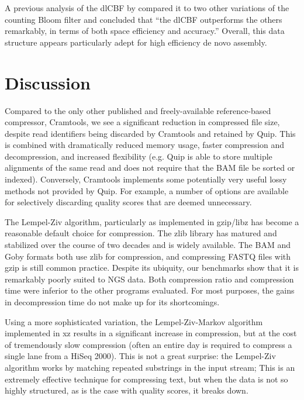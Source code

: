 \documentclass[twocolumn]{article}
\begin{document}
A previous analysis of the dlCBF by \citet{Zhang2009} compared it to two other
variations of the counting Bloom filter and concluded that ``the dlCBF
outperforms the others remarkably, in terms of both space efficiency and
accuracy.'' Overall, this data structure appears particularly adept for high
efficiency de novo assembly.

\section{Discussion}

Compared to the only other published and freely-available reference-based
compressor, Cramtools, we see a significant reduction in compressed file size,
despite read identifiers being discarded by Cramtools and retained by Quip.
This is combined with dramatically reduced memory usage, faster compression
and decompression, and increased flexibility (e.g. Quip is able to store
multiple alignments of the same read and does not require that the BAM file be
sorted or indexed). Conversely, Cramtools implements some potentially very
useful lossy methods not provided by Quip. For example, a number of options
are available for selectively discarding quality scores that are deemed
unnecessary.



The Lempel-Ziv algorithm, particularly as implemented in gzip/libz has become
a reasonable default choice for compression. The zlib library has matured and stabilized
over the course of two decades and is widely available. The BAM and Goby
formats both use zlib for compression, and compressing FASTQ files with gzip
is still common practice. Despite its ubiquity, our benchmarks show that it is
remarkably poorly suited to NGS data. Both compression ratio and compression
time were inferior to the other programs evaluated. For most purposes, the
gains in decompression time do not make up for its shortcomings.

Using a more sophisticated variation, the Lempel-Ziv-Markov algorithm
implemented in xz results in a significant increase in compression, but at the
cost of tremendously slow compression (often an entire day is required to
compress a single lane from a HiSeq 2000). This is not a great surprise: the
Lempel-Ziv algorithm works by matching repeated substrings in the input
stream; This is an extremely effective technique for compressing text, but
when the data is not so highly structured, as is the case with quality scores,
it breaks down.
\end{document}
